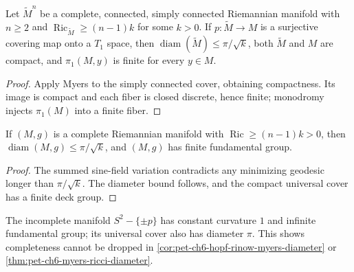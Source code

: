 \begin{theorem}
  \label{thm:pet-ch6-myers-explicit-cover}


  Let $\widetilde M^n$ be a complete, connected, simply connected Riemannian
  manifold with $n\ge2$ and $\operatorname{Ric}_{\widetilde M}\ge(n-1)k$ for
  some $k>0$. If $p:\widetilde M\to M$ is a surjective covering map onto a
  $T_1$ space, then
  $\operatorname{diam}(\widetilde M)\le\pi/\sqrt k$, both $\widetilde M$ and
  $M$ are compact, and $\pi_1(M,y)$ is finite for every $y\in M$.
\end{theorem}
\begin{proof}

  \sketch
  Apply Myers to the simply connected cover, obtaining compactness. Its image is compact and each fiber is closed discrete, hence finite; monodromy injects \(\pi_1(M)\) into a finite fiber.
\end{proof}

\begin{theorem}
  \label{thm:pet-ch6-myers-ricci-diameter}


  If $(M,g)$ is a complete Riemannian manifold with $\operatorname{Ric}\ge(n-1)k>0$,
  then $\operatorname{diam}(M,g)\le\pi/\sqrt k$, and $(M,g)$ has finite fundamental
  group.
\end{theorem}
\begin{proof}
  \sketch
  The summed sine-field variation contradicts any minimizing geodesic longer than \(\pi/\sqrt{k}\). The diameter bound follows, and the compact universal cover has a finite deck group.
\end{proof}

\begin{example}
  \label{ex:pet-ch6-punctured-sphere-infinite-pi1}


  The incomplete manifold $S^2-\{\pm p\}$ has constant curvature $1$ and
  infinite fundamental group; its universal cover also has diameter $\pi$.
  This shows completeness cannot be dropped in
  \cref{cor:pet-ch6-hopf-rinow-myers-diameter} or
  \cref{thm:pet-ch6-myers-ricci-diameter}.
\end{example}

